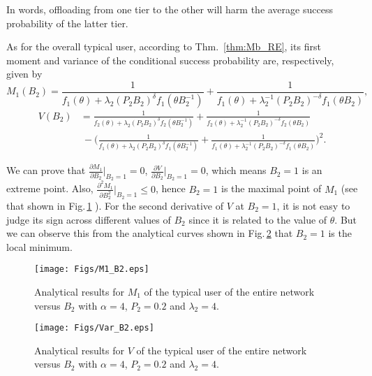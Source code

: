 \documentclass[12pt,draftclsnofoot,journal,onecolumn]{IEEEtran}
\def\figref#1{Fig.\,\ref{#1}}%
\newlength{\figwidth}
\begin{document}
In words, offloading from one tier to the other will harm the average success probability of the latter tier. 

As for the overall typical user, according to Thm.~\ref{thm:Mb_RE}, its first moment and variance of the conditional success probability are, respectively, given by 
\begin{equation}
M_1(B_2) = \frac{1}{f_1(\theta)+\lambda_2 (P_2 B_2)^\delta f_1(\theta B_2^{-1})} + \frac{1}{f_1(\theta)+\lambda_2^{-1} (P_2 B_2)^{-\delta}f_1(\theta B_2)},
\end{equation}
\begin{align}
V(B_2) &= \frac{1}{f_2(\theta)+\lambda_2 (P_2 B_2)^\delta f_2(\theta B_2^{-1})} + \frac{1}{f_2(\theta)+\lambda_2^{-1} (P_2 B_2)^{-\delta} f_2(\theta B_2)} \nonumber \\
&~ -\Bigg(\frac{1}{f_1(\theta)+\lambda_2 (P_2 B_2)^\delta f_1(\theta B_2^{-1})} + \frac{1}{f_1(\theta)+\lambda_2^{-1} (P_2 B_2)^{-\delta} f_1(\theta B_2)} \Bigg)^2.
\end{align} 

We can prove that $\frac{\partial M_1}{\partial B_2}\Big |_{B_2=1} = 0$, $\frac{\partial V}{\partial B_2}\Big |_{B_2=1} = 0$, which means $B_2=1$ is an extreme point. Also, $\frac{\partial^2 M_1}{\partial B_2^2}\Big |_{B_2=1} \leq 0$, hence $B_2=1$ is the maximal point of $M_1$ (see that shown in \figref{fig:M1B2} ). For the second derivative of $V$ at $B_2=1$, it is not easy to judge its sign across different values of $B_2$ since it is related to the value of $\theta$. But we can observe this from the analytical curves shown in \figref{fig:VarV2} that $B_2 = 1$ is the local minimum.
\begin{figure} [!t]
	\begin{center}
		\texttt{[image: Figs/M1\_B2.eps]}
		\caption{Analytical results for $M_1$ of the typical user of the entire network versus $B_2$ with $\alpha=4$, $P_2=0.2$ and $\lambda_2=4$.}
		\label{fig:M1B2}
	\end{center}
\end{figure} 
\begin{figure} [!ht]
	\begin{center}
		\texttt{[image: Figs/Var\_B2.eps]}
		\caption{Analytical results for $V$ of the typical user of the entire network versus $B_2$ with $\alpha=4$, $P_2=0.2$ and $\lambda_2=4$.}
		\label{fig:VarV2}
	\end{center}
\end{figure}
\end{document}
